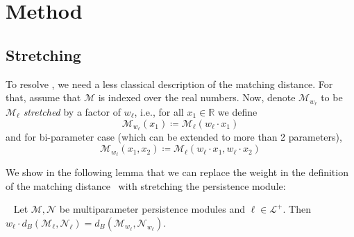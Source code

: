 \documentclass[sigconf, nonacm, natbib=false]{acmart} %
\def\M {{\mathcal{M}}}
\def\N {{\mathcal{N}}}
\def\RR{{\mathbb{R}}}
\def\param{k}
\def\parax{x_1}
\def\paray{x_2}
\theoremstyle{plain}
\begin{document}
\section{Method}\label{sec:methods}
\subsection{Stretching}\label{sec:stretching}
To resolve ,
we need a less classical description of the matching distance. 
For that, assume that $\M$ is indexed over the real numbers.
Now, denote $\M_{w_\ell}$ to be $\M_\ell$ \emph{stretched} by a factor of $w_\ell$, %
i.e., for all $\parax\in\RR$ we define 
\begin{equation}
  \M_{w_\ell}(\parax)\coloneqq \M_{\ell}(w_\ell\cdot \parax)\label{eq:module_stretch}
\end{equation}
and for bi-parameter case (which can be extended to more than 2 parameters), 
\begin{equation}
\M_{w_\ell}(\parax,\paray)\coloneqq \M_{\ell}(w_\ell\cdot \parax, w_\ell\cdot \paray)
\end{equation}

We show in the following lemma that we can replace the weight in the definition of the matching distance~ with stretching the persistence module:

\begin{lemma}~\label{lem:weight_translation}
Let $\M,\N$ be multiparameter persistence modules and $\ell\in\mathcal{L}^+$.
Then  $w_\ell\cdot d_B(\M_\ell,\N_\ell)=d_B(\M_{w_\ell},\N_{w_\ell})$.
\end{lemma}
\end{document}
